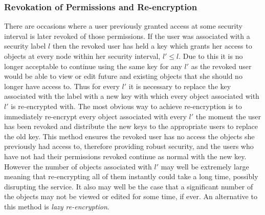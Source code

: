 \documentclass[12pt, titlepage]{article}
\begin{document}
\subsubsection{Revokation of Permissions and Re-encryption}
There are occasions where a user previously granted access at some security interval is later revoked of those permissions. If the user was associated with a security label $l$ then the revoked user has held a key which grants her access to objects at every node within her security interval, $l' \le l$. Due to this it is no longer acceptable to continue using the same key for any $l'$ as the revoked user would be able to view or edit future and existing objects that she should no longer have access to. Thus for every $l'$ it is necessary to replace the key associated with the label with a new key with which every object associated with $l'$ is re-encrypted with.
\newline \indent The most obvious way to achieve re-encryption is to immediately re-encrypt every object associated with every $l'$ the moment the user has been revoked and distribute the new keys to the appropriate users to replace the old key. This method ensures the revoked user has no access the objects she previously had access to, therefore providing robust security, and the users who have not had their permissions revoked continue as normal with the new key. However the number of objects associated with $l'$ may well be extremely large meaning that re-encrypting all of them instantly could take a long time, possibly disrupting the service. It also may well be the case that a significant number of the objects may not be viewed or edited for some time, if ever. An alternative to this method is \textit{lazy re-encryption}.
\end{document}
